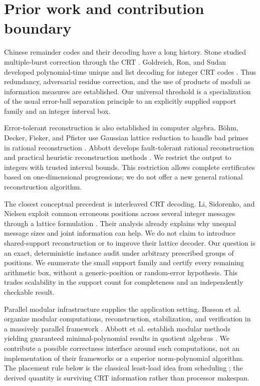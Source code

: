 \documentclass[11pt]{article}
\theoremstyle{definition}\newtheorem{definition}[theorem]{Definition}
\begin{document}
\section{Prior work and contribution boundary}
Chinese remainder codes and their decoding have a long history. Stone studied multiple-burst correction through the CRT \cite{stone}. Goldreich, Ron, and Sudan developed polynomial-time unique and list decoding for integer CRT codes \cite{grs}. Thus redundancy, adversarial residue correction, and the use of products of moduli as information measures are established. Our universal threshold is a specialization of the usual error-ball separation principle to an explicitly supplied support family and an integer interval box.

Error-tolerant reconstruction is also established in computer algebra. B\"ohm, Decker, Fieker, and Pfister use Gaussian lattice reduction to handle bad primes in rational reconstruction \cite{boehm}. Abbott develops fault-tolerant rational reconstruction and practical heuristic reconstruction methods \cite{abbott}. We restrict the output to integers with trusted interval bounds. This restriction allows complete certificates based on one-dimensional progressions; we do not offer a new general rational reconstruction algorithm.

The closest conceptual precedent is interleaved CRT decoding. Li, Sidorenko, and Nielsen exploit common erroneous positions across several integer messages through a lattice formulation \cite{lsn}. Their analysis already explains why unequal message sizes and joint information can help. We do not claim to introduce shared-support reconstruction or to improve their lattice decoder. Our question is an exact, deterministic instance audit under arbitrary prescribed groups of positions. We enumerate the small support family and certify every remaining arithmetic box, without a generic-position or random-error hypothesis. This trades scalability in the support count for completeness and an independently checkable result.

Parallel modular infrastructure supplies the application setting. Basson et al. organize modular computations, reconstruction, stabilization, and verification in a massively parallel framework \cite{basson}. Abbott et al. establish modular methods yielding guaranteed minimal-polynomial results in quotient algebras \cite{minpoly}. We contribute a possible correctness interface around such computations, not an implementation of their frameworks or a superior norm-polynomial algorithm. The placement rule below is the classical least-load idea from scheduling \cite{graham}; the derived quantity is surviving CRT information rather than processor makespan.
\end{document}

